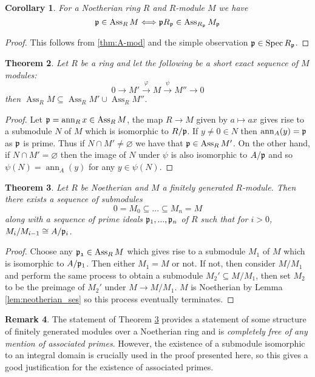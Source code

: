 \documentclass[12pt]{article}
\theoremstyle{plain}
\newtheorem{thm}{Theorem}[subsection] %
\newtheorem{cor}[thm]{Corollary}
\theoremstyle{definition}
\newtheorem{remark}[thm]{Remark}
\newcommand{\lto}{\longrightarrow}
\begin{document}
	\begin{cor}
		\label{cor:ass_R,ass_Rp}
		For a Noetherian ring $R$ and $R$-module $M$ we have
		\[\frak{p} \in \operatorname{Ass}_RM \Longleftrightarrow \frak{p}R_\frak{p} \in \operatorname{Ass}_{R_\frak{p}}M_{\frak{p}}\]
	\end{cor}
	\begin{proof}
		This follows from \eqref{thm:A-mod} and the simple observation $\frak{p} \in \operatorname{Spec}R_{\frak{p}}$.
	\end{proof}
	\begin{thm}
		\label{thm:shortexactsequence_ass}
		Let $R$ be a ring and let the following be a short exact sequence of $M$ modules:
		\[0 \lto M' \stackrel{\varphi}{\lto} M \stackrel{\psi}{\lto} M'' \lto 0\]
		then $\operatorname{Ass}_RM \subseteq \operatorname{Ass}_RM' \cup \operatorname{Ass}_RM''$.
	\end{thm}
	\begin{proof}
		Let $\frak{p} = \operatorname{ann}_Rx \in \operatorname{Ass}_RM$, the map $R \lto M$ given by $a \mapsto ax$ gives rise to a submodule $N$ of $M$ which is isomorphic to $R/\frak{p}$. If $y \neq 0 \in N$ then $\operatorname{ann}_A(y) = \frak{p}$ as $\frak{p}$ is prime. Thus if $N \cap M' \neq \varnothing$ we have that $\frak{p} \in \operatorname{Ass}_RM'$. On the other hand, if $N \cap M' = \varnothing$ then the image of $N$ under $\psi$ is also isomorphic to $A/\frak{p}$ and so $\psi(N) = \operatorname{ann}_A(y)$ for any $y \in \psi(N)$.
	\end{proof}
	\begin{thm}
		\label{thm:sequence}
		Let $R$ be Noetherian and $M$ a finitely generated $R$-module. Then there exists a sequence of submodules
		\[0 = M_0 \subseteq ... \subseteq M_n = M\]
		along with a sequence of prime ideals $\frak{p}_1,...,\frak{p}_n$ of $R$ such that for $i > 0$, $M_i/M_{i-1} \cong A/\frak{p}_i$.
	\end{thm}
	\begin{proof}
		Choose any $\frak{p_1} \in \operatorname{Ass}_RM$ which gives rise to a submodule $M_1$ of $M$ which is isomorphic to $A/\frak{p}_1$. Then either $M_1 = M$ or not. If not, then consider $M/M_1$ and perform the same process to obtain a submodule $M_2' \subseteq M/M_1$, then set $M_2$ to be the preimage of $M_2'$ under $M \lto M/M_1$. $M$ is Noetherian by Lemma \ref{lem:neotherian_ses} so this process eventually terminates.
	\end{proof}
	\begin{remark}
		The statement of Theorem \ref{thm:sequence} provides a statement of some structure of finitely generated modules over a Noetherian ring and is \emph{completely free of any mention of associated primes}. However, the existence of a submodule isomorphic to an integral domain is crucially used in the proof presented here, so this gives a good justification for the existence of associated primes.
	\end{remark}
\end{document}
